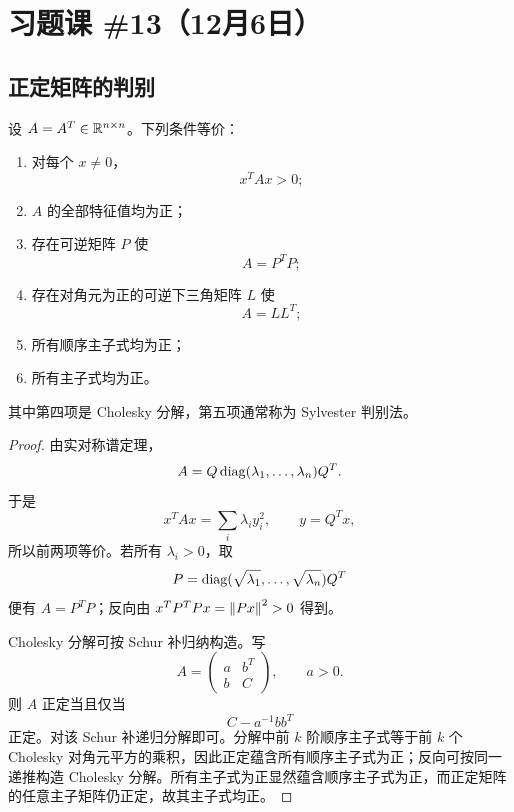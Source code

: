 \section{习题课 \#13（12月6日）}

\subsection{正定矩阵的判别}

设 $A=A^T\in\mathbb R^{n\times n}$。下列条件等价：
\begin{enumerate}
  \item 对每个 $x\neq0$，
  \begin{equation}
   x^TAx>0;
  \end{equation}
  \item $A$ 的全部特征值均为正；
  \item 存在可逆矩阵 $P$ 使
  \begin{equation}
   A=P^TP;
  \end{equation}
  \item 存在对角元为正的可逆下三角矩阵 $L$ 使
  \begin{equation}
   A=LL^T;
  \end{equation}
  \item 所有顺序主子式均为正；
  \item 所有主子式均为正。
\end{enumerate}
其中第四项是 Cholesky 分解，第五项通常称为 Sylvester 判别法。

\begin{proof}
由实对称谱定理，
\begin{equation}
 A=Q\operatorname{diag}(\lambda_1,\ldots,\lambda_n)Q^T.
\end{equation}
于是
\begin{equation}
 x^TAx=\sum_i\lambda_i y_i^2,
 \qquad y=Q^Tx,
\end{equation}
所以前两项等价。若所有 $\lambda_i>0$，取
\begin{equation}
 P=\operatorname{diag}(\sqrt{\lambda_1},\ldots,\sqrt{\lambda_n})Q^T
\end{equation}
便有 $A=P^TP$；反向由 $x^TP^TPx=\left\lVert Px\right\rVert^2>0$ 得到。

Cholesky 分解可按 Schur 补归纳构造。写
\begin{equation}
 A=\begin{pmatrix}a&b^T\\b&C\end{pmatrix},
 \qquad a>0.
\end{equation}
则 $A$ 正定当且仅当
\begin{equation}
 C-a^{-1}bb^T
\end{equation}
正定。对该 Schur 补递归分解即可。分解中前 $k$ 阶顺序主子式等于前 $k$ 个 Cholesky 对角元平方的乘积，因此正定蕴含所有顺序主子式为正；反向可按同一递推构造 Cholesky 分解。所有主子式为正显然蕴含顺序主子式为正，而正定矩阵的任意主子矩阵仍正定，故其主子式均正。
\end{proof}


